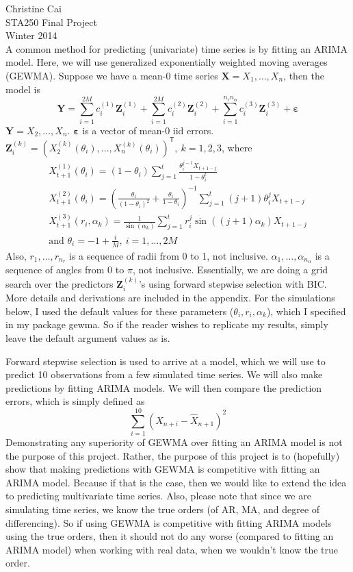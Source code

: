 \documentclass[12pt]{article}
\newcommand{\trans}{^\mathsf{T}}
\begin{document}
\noindent Christine Cai\\
STA250 Final Project\\
Winter 2014\\

A common method for predicting (univariate) time series is by fitting an ARIMA model. Here, we will use generalized exponentially weighted moving averages (GEWMA). Suppose we have a mean-0 time series $\mathbf{X} = X_1, \dots, X_n$, then the model is 
\[\mathbf{Y} = \sum_{i=1}^{2M} c_i^{(1)}\mathbf{Z}_i^{(1)} + \sum_{i=1}^{2M} c_i^{(2)}\mathbf{Z}_i^{(2)} + \sum_{i=1}^{n_rn_\alpha} c_i^{(3)}\mathbf{Z}_i^{(3)} + \boldsymbol{\varepsilon}\]
$\mathbf{Y} = X_2, \dots, X_n$. $\boldsymbol{\varepsilon}$ is a vector of mean-0 iid errors. $\mathbf{Z}_i^{(k)} = \left(X_2^{(k)}(\theta_i), \dots, X_n^{(k)}(\theta_i)\right)\trans,\ k = 1, 2, 3$, where 
\begin{gather*}
X_{t+1}^{(1)}(\theta_i) = (1-\theta_i)\sum_{j=1}^t\frac{\theta_i^{j-1}X_{t+1-j}}{1-\theta_i^t}\\
X_{t+1}^{(2)}(\theta_i) = \left(\frac{\theta_i}{(1-\theta_i)^2} + \frac{\theta_i}{1-\theta_i}\right)^{-1} \sum_{j=1}^t (j+1)\theta_i^jX_{t+1-j}\\
X_{t+1}^{(3)}(r_i, \alpha_k) = \frac{1}{\sin(\alpha_k)} \sum_{j=1}^t r_i^j\sin((j+1)\alpha_k)X_{t+1-j}\\
\text{and } \theta_i = -1 + \frac{i}{M},\ i = 1, \dots, 2M
\end{gather*}
Also, $r_1, \dots, r_{n_r}$ is a sequence of radii from 0 to 1, not inclusive. $\alpha_1, \dots, \alpha_{n_\alpha}$ is a sequence of angles from 0 to $\pi$, not inclusive. Essentially, we are doing a grid search over the predictors $\mathbf{Z}_i^{(k)}$'s using forward stepwise selection with BIC. More details and derivations are included in the appendix. For the simulations below, I used the default values for these parameters ($\theta_i, r_i, \alpha_k$), which I specified in my package gewma. So if the reader wishes to replicate my results, simply leave the default argument values as is.

Forward stepwise selection is used to arrive at a model, which we will use to predict 10 observations from a few simulated time series. We will also make predictions by fitting ARIMA models. We will then compare the prediction errors, which is simply defined as 
\[\sum_{i=1}^{10} (X_{n+i}-\hat{X}_{n+1})^2\]
Demonstrating any superiority of GEWMA over fitting an ARIMA model is not the purpose of this project. Rather, the purpose of this project is to (hopefully) show that making predictions with GEWMA is competitive with fitting an ARIMA model. Because if that is the case, then we would like to extend the idea to predicting multivariate time series. Also, please note that since we are simulating time series, we know the true orders (of AR, MA, and degree of differencing). So if using GEWMA is competitive with fitting ARIMA models using the true orders, then it should not do any worse (compared to fitting an ARIMA model) when working with real data, when we wouldn't know the true order.
\end{document}
